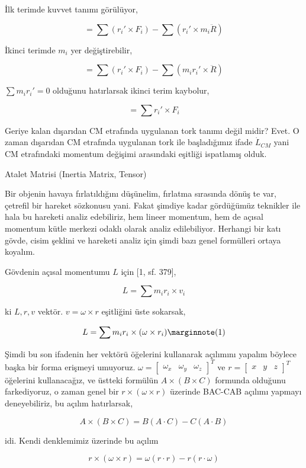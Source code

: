 \documentclass[12pt,fleqn]{article}\usepackage{../../common}
\begin{document}
İlk terimde kuvvet tanımı görülüyor,

$$
= \sum (r_i' \times F_i ) - \sum (r_i' \times m_i \ddot{R})
$$

İkinci terimde $m_i$ yer değiştirebilir,

$$
= \sum (r_i' \times F_i ) - \sum (m_i r_i' \times \ddot{R})
$$

$\sum m_i r_i'=0$ olduğunu hatırlarsak ikinci terim kaybolur,

$$
= \sum r_i' \times F_i 
$$

Geriye kalan dışarıdan CM etrafında uygulanan tork tanımı değil midir? Evet.  O
zaman dışarıdan CM etrafında uygulanan tork ile başladığımız ifade
$\dot{L}_{CM}$ yani CM etrafındaki momentum değişimi arasındaki eşitliği
ispatlamış olduk.

Atalet Matrisi (Inertia Matrix, Tensor)

Bir objenin havaya fırlatıldığını düşünelim, fırlatma sırasında dönüş te var,
çetrefil bir hareket sözkonusu yani. Fakat şimdiye kadar gördüğümüz teknikler
ile hala bu hareketi analiz edebiliriz, hem lineer momentum, hem de açısal
momentum kütle merkezi odaklı olarak analiz edilebiliyor. Herhangi bir katı
gövde, cisim şeklini ve hareketi analiz için şimdi bazı genel formülleri
ortaya koyalım. 

Gövdenin açısal momentumu $L$ için [1, sf. 379],

$$
L = \sum m_i r_i \times v_i
$$

ki $L,r,v$ vektör. $v = \omega \times r$ eşitliğini üste sokarsak,

$$
L = \sum m_i r_i \times (\omega \times r_i)
\mlabel{1}
$$

Şimdi bu son ifadenin her vektörü öğelerini kullanarak açılımını yapalım böylece
başka bir forma erişmeyi umuyoruz. $\omega = [\begin{array}{ccc} \omega_x&\omega_y&\omega_z \end{array}]^T$
ve $r = [\begin{array}{ccc} x&y&z \end{array}]^T$ öğelerini kullanacağız, ve
üstteki formülün $A \times (B \times C)$ formunda olduğunu farkediyoruz, o zaman
genel bir $r \times (\omega \times r)$ üzerinde BAC-CAB açılımı yapmayı
deneyebiliriz, bu açılım hatırlarsak,

$$
A \times (B \times C) = B(A \cdot C) - C(A \cdot B)
$$

idi. Kendi denklemimiz üzerinde bu açılım

$$
r \times (\omega \times r) = \omega (r \cdot r) - r(r \cdot \omega)
$$
\end{document}
